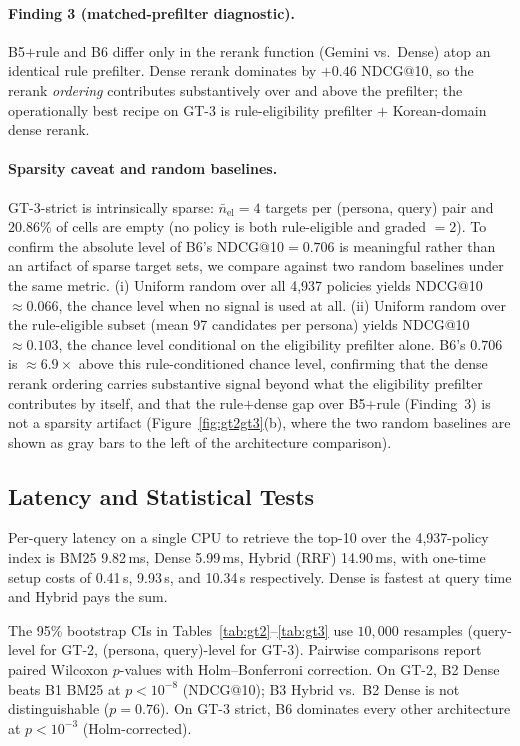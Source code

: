 \documentclass{article}
\newcommand{\npolicy}{4{,}937}
\begin{document}
\paragraph{Finding 3 (matched-prefilter diagnostic).}
B5$+$rule and B6 differ only in the rerank function (Gemini vs.\
Dense) atop an identical rule prefilter. Dense rerank dominates by
$+0.46$ NDCG@10, so the rerank \emph{ordering} contributes
substantively over and above the prefilter; the operationally best
recipe on GT-3 is rule-eligibility prefilter $+$ Korean-domain dense
rerank.

\paragraph{Sparsity caveat and random baselines.}
GT-3-strict is intrinsically sparse: $\bar n_{\mathrm{el}}{=}4$
targets per (persona, query) pair and $20.86\%$ of cells are empty
(no policy is both rule-eligible and graded $=2$). To confirm the
absolute level of B6's NDCG@10$=0.706$ is meaningful rather than an
artifact of sparse target sets, we compare against two random
baselines under the same metric. (i) Uniform random over all
\npolicy{} policies yields NDCG@10$\approx{}0.066$, the chance level
when no signal is used at all. (ii) Uniform random over the
rule-eligible subset (mean 97 candidates per persona) yields
NDCG@10$\approx{}0.103$, the chance level conditional on the
eligibility prefilter alone. B6's $0.706$ is $\approx{}6.9\times$
above this rule-conditioned chance level, confirming that the dense
rerank ordering carries substantive signal beyond what the
eligibility prefilter contributes by itself, and that the rule$+$dense
gap over B5$+$rule (Finding~3) is not a sparsity artifact
(Figure~\ref{fig:gt2gt3}(b), where the two random baselines are shown
as gray bars to the left of the architecture comparison).

\subsection{Latency and Statistical Tests}
\label{sec:exp:latency}

Per-query latency on a single CPU to retrieve the top-10 over the
\npolicy{}-policy index is BM25 9.82\,ms, Dense 5.99\,ms, Hybrid
(RRF) 14.90\,ms, with one-time setup costs of 0.41\,s, 9.93\,s, and
10.34\,s respectively. Dense is fastest at query time and Hybrid
pays the sum.

The 95\% bootstrap CIs in Tables~\ref{tab:gt2}--\ref{tab:gt3} use
$10{,}000$ resamples (query-level for GT-2, (persona, query)-level
for GT-3). Pairwise comparisons report paired Wilcoxon $p$-values
with Holm--Bonferroni correction. On GT-2, B2 Dense beats B1 BM25 at
$p{<}10^{-8}$ (NDCG@10); B3 Hybrid vs.\ B2 Dense is not
distinguishable ($p{=}0.76$). On GT-3 strict, B6 dominates every
other architecture at $p{<}10^{-3}$ (Holm-corrected).
\end{document}
